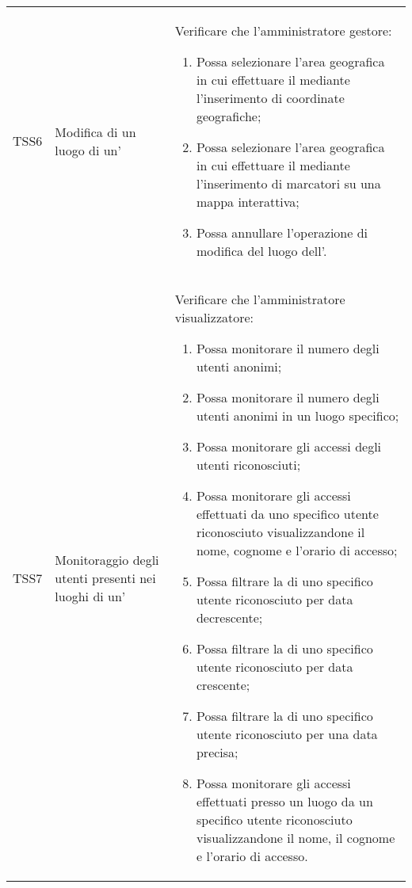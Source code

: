 {\begin{longtable}{ c  C{3cm}  C{11cm} }
TSS6 & Modifica di un luogo di un' & 
Verificare che l'amministratore gestore:
\begin{enumerate}[resume]
    \item Possa selezionare l'area geografica in cui effettuare il  mediante l'inserimento di coordinate geografiche;
    \item Possa selezionare l'area geografica in cui effettuare il  mediante l'inserimento di marcatori su una mappa interattiva;
    \item Possa annullare l'operazione di modifica del luogo dell'.
\end{enumerate} \\

TSS7 & Monitoraggio degli utenti presenti nei luoghi di un' &
Verificare che l'amministratore visualizzatore:
\begin{enumerate}[resume]
    \item Possa monitorare il numero degli utenti anonimi;
    \item Possa monitorare il numero degli utenti anonimi in un luogo specifico;
    \item Possa monitorare gli accessi degli utenti riconosciuti;
    \item Possa monitorare gli accessi effettuati da uno specifico utente riconosciuto visualizzandone il nome, cognome e l'orario di accesso;
    \item Possa filtrare la  di uno specifico utente riconosciuto per data decrescente;
    \item Possa filtrare la  di uno specifico utente riconosciuto per data crescente;
    \item Possa filtrare la  di uno specifico utente riconosciuto per una data precisa;
    \item Possa monitorare gli accessi effettuati presso un luogo da un specifico utente riconosciuto visualizzandone il nome, il cognome e l’orario di accesso.
\end{enumerate} \\


\end{longtable}}
